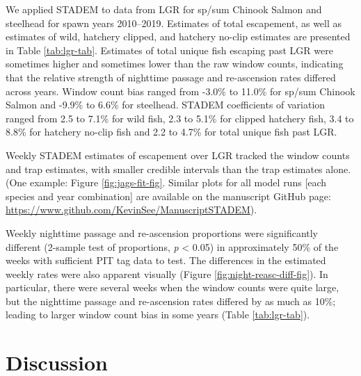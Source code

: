 \documentclass[
  12pt,
]{article}
\begin{document}
We applied STADEM to data from LGR for sp/sum Chinook Salmon and steelhead for spawn years 2010--2019. Estimates of total escapement, as well as estimates of wild, hatchery clipped, and hatchery no-clip estimates are presented in Table \ref{tab:lgr-tab}. Estimates of total unique fish escaping past LGR were sometimes higher and sometimes lower than the raw window counts, indicating that the relative strength of nighttime passage and re-ascension rates differed across years. Window count bias ranged from -3.0\% to 11.0\% for sp/sum Chinook Salmon and -9.9\% to 6.6\% for steelhead. STADEM coefficients of variation ranged from 2.5 to 7.1\% for wild fish, 2.3 to 5.1\% for clipped hatchery fish, 3.4 to 8.8\% for hatchery no-clip fish and 2.2 to 4.7\% for total unique fish past LGR.

Weekly STADEM estimates of escapement over LGR tracked the window counts and trap estimates, with smaller credible intervals than the trap estimates alone. (One example: Figure \ref{fig:jags-fit-fig}. Similar plots for all model runs {[}each species and year combination{]} are available on the manuscript GitHub page: \href{\%5Bhttps://www.github.com/KevinSee/ManuscriptSTADEM\%5D}{https://www.github.com/KevinSee/ManuscriptSTADEM}).

Weekly nighttime passage and re-ascension proportions were significantly different (2-sample test of proportions, \emph{p} \textless{} 0.05) in approximately 50\% of the weeks with sufficient PIT tag data to test. The differences in the estimated weekly rates were also apparent visually (Figure \ref{fig:night-reasc-diff-fig}). In particular, there were several weeks when the window counts were quite large, but the nighttime passage and re-ascension rates differed by as much as 10\%; leading to larger window count bias in some years (Table \ref{tab:lgr-tab}).

\hypertarget{discussion}{%
\section{Discussion}\label{discussion}}
\end{document}
